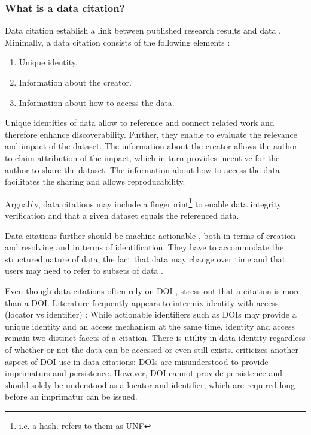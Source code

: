 \documentclass[a4paper,10pt]{article}
\begin{document}
\subsubsection{What is a data citation?}
Data citation establish a link between published research results and data \citep{CODATA2013}. Minimally, a data citation consists of the following elements \citep{Cook2016}:

\begin{enumerate}
 \item Unique identity.
 \item Information about the creator.
 \item Information about how to access the data.
\end{enumerate}

Unique identities of data allow to reference and connect related work and therefore enhance discoverability. Further, they enable to evaluate the relevance and impact of the dataset. The information about the creator allows the author to claim attribution of the impact, which in turn provides incentive for the author to share the dataset. The information about how to access the data facilitates the sharing and allows reproducability.

Arguably, data citations may include a fingerprint\footnote{i.e. a hash. \citep{Crosas2011} refers to them as \gls{UNF}} to enable data integrity verification \citep{Crosas2011} and that a given dataset equals the referenced data.

Data citations further should be machine-actionable \citep{Assante2016, Altman2015, Buneman2016}, both in terms of creation and resolving and in terms of identification.
They have to accommodate the structured nature of data, the fact that data may change over time and that users may need to refer to subsets of data \citep{Buneman2010}.

Even though data citations often rely on \gls{DOI} \citep{Castelli2013}, \cite{Buneman2010} stress out that a citation is more than a \gls{DOI}.
Literature frequently appears to intermix identity with access (locator vs identifier) \citep{ESIP2012a}: While actionable identifiers such as \glspl{DOI} may provide a unique identity and an access mechanism at the same time, identity and access remain two distinct facets of a citation. There is utility in data identity regardless of whether or not the data can be accessed or even still exists.
\Cite{Parsons2013a} criticizes another aspect of \gls{DOI} use in data citations: \Glspl{DOI} are misunderstood to provide imprimaturs and persistence. However, \gls{DOI} cannot provide persistence and should solely be understood as a locator and identifier, which are required long before an imprimatur can be issued.
\end{document}
